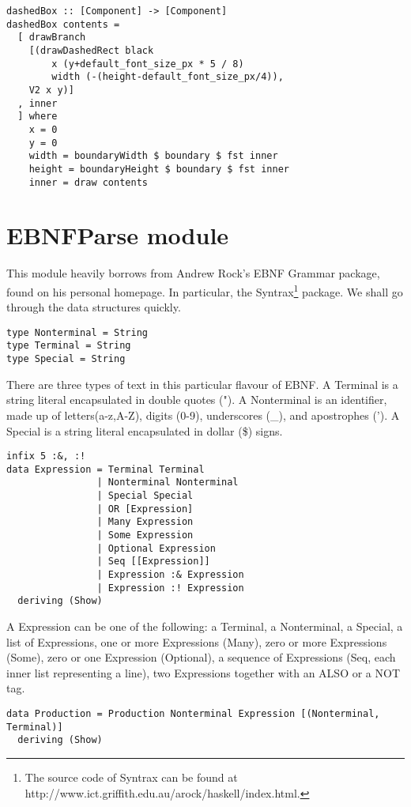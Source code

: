 \documentclass[a4paper]{article}
\begin{document}
\begin{verbatim}
dashedBox :: [Component] -> [Component]
dashedBox contents =
  [ drawBranch 
    [(drawDashedRect black 
        x (y+default_font_size_px * 5 / 8)
        width (-(height-default_font_size_px/4)),
    V2 x y)]
  , inner
  ] where
    x = 0 
    y = 0
    width = boundaryWidth $ boundary $ fst inner 
    height = boundaryHeight $ boundary $ fst inner 
    inner = draw contents
\end{verbatim}

\section{EBNFParse module}
This module heavily borrows from Andrew Rock's EBNF Grammar package, found on his personal homepage. In particular, the Syntrax\footnote{The source code of Syntrax can be found at http://www.ict.griffith.edu.au/arock/haskell/index.html.} package. We shall go through the data structures quickly.

\begin{verbatim}
type Nonterminal = String
type Terminal = String
type Special = String
\end{verbatim}

There are three types of text in this particular flavour of EBNF. 
A Terminal is a string literal encapsulated in double quotes ("). 
A Nonterminal is an identifier, made up of letters(a-z,A-Z), digits (0-9), underscores (\_), and apostrophes ('). 
A Special is a string literal encapsulated in dollar (\$) signs.

\begin{verbatim}
infix 5 :&, :!
data Expression = Terminal Terminal
                | Nonterminal Nonterminal
                | Special Special
                | OR [Expression]
                | Many Expression
                | Some Expression
                | Optional Expression
                | Seq [[Expression]]
                | Expression :& Expression
                | Expression :! Expression
  deriving (Show)
\end{verbatim}

A Expression can be one of the following: a Terminal, a Nonterminal, a Special, a list of Expressions, one or more Expressions (Many), zero or more Expressions (Some), zero or one Expression (Optional), a sequence of Expressions (Seq, each inner list representing a line), two Expressions together with an ALSO or a NOT tag.

\begin{verbatim}
data Production = Production Nonterminal Expression [(Nonterminal, Terminal)]
  deriving (Show)
\end{verbatim}
\end{document}
